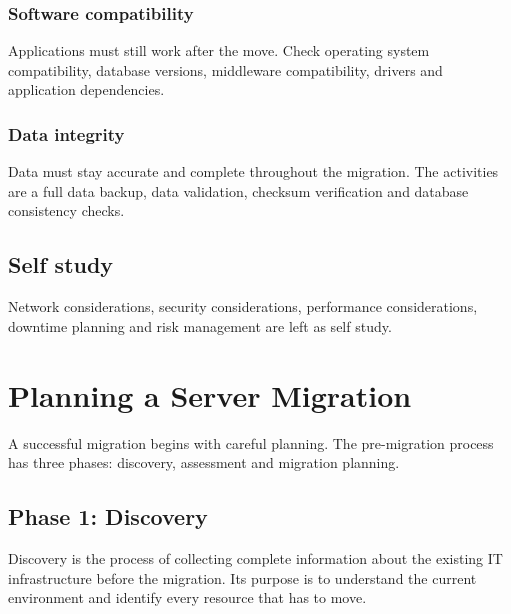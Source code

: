 \documentclass[11pt,a4paper]{article}
\begin{document}
\subsubsection{Software compatibility}

Applications must still work after the move. Check operating system compatibility, database
versions, middleware compatibility, drivers and application dependencies.

\subsubsection{Data integrity}

Data must stay accurate and complete throughout the migration. The activities are a full data
backup, data validation, checksum verification and database consistency checks.

\subsection*{Self study}

Network considerations, security considerations, performance considerations, downtime planning
and risk management are left as self study.

\newpage
\section{Planning a Server Migration}

A successful migration begins with careful planning. The pre-migration process has three
phases: discovery, assessment and migration planning.


\subsection{Phase 1: Discovery}

Discovery is the process of collecting complete information about the existing IT
infrastructure before the migration. Its purpose is to understand the current environment and
identify every resource that has to move.
\end{document}
